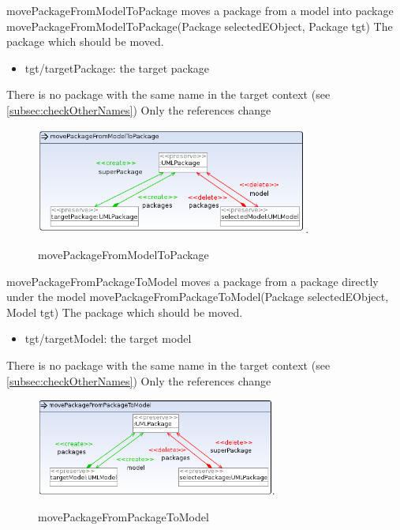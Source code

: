 \op
{movePackageFromModelToPackage}
{moves a package from a model into package}
{movePackageFromModelToPackage(Package selectedEObject, Package tgt)}
{The package which should be moved.}
{
\begin{itemize}
 \item tgt/targetPackage: the target package
\end{itemize}
}
{There is no package with the same name in the target context (see
\ref{subsec:checkOtherNames})}
{Only the references change}
\begin{figure}[H]
  \centering
  \includegraphics[width=0.8\textwidth]{pics/movePackageFromModelToPackage.png}.
  \caption{movePackageFromModelToPackage}
  \label{movePackageFromModelToPackage}
\end{figure}
\op
{movePackageFromPackageToModel}
{moves a package from a package directly under the model}
{movePackageFromPackageToModel(Package selectedEObject, Model tgt)}
{The package which should be moved.}
{
\begin{itemize}
 \item tgt/targetModel: the target model
\end{itemize}
}
{There is no package with the same name in the target context (see
\ref{subsec:checkOtherNames})}
{Only the references change}
\begin{figure}[H]
  \centering
  \includegraphics[width=0.7\textwidth]{pics/movePackageFromPackageToModel.png}.
  \caption{movePackageFromPackageToModel}
  \label{movePackageFromPackageToModel}
\end{figure}
